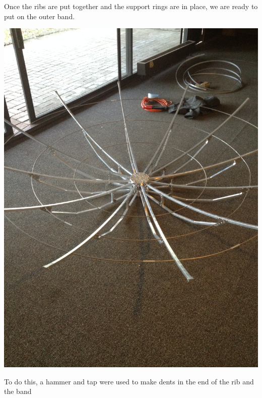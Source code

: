 \documentclass[11pt]{article} %
\begin{document}
Once the ribs are put together and the support rings are in place, we are ready to put on the outer band.

\begin{center}
\includegraphics[scale=0.12]{dish/04.jpeg}
\end{center}

To do this, a hammer and tap were used to make dents in the end of the rib and the band
\end{document}
